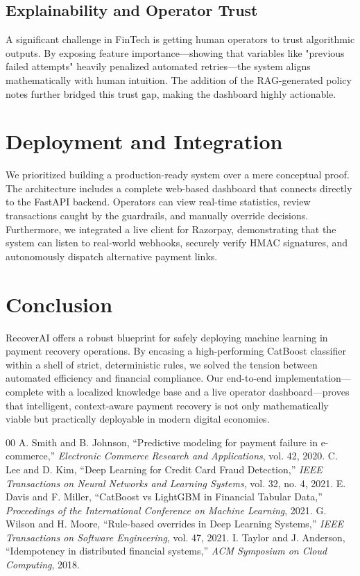 \documentclass[conference]{IEEEtran}
\begin{document}
\subsection{Explainability and Operator Trust}
A significant challenge in FinTech is getting human operators to trust algorithmic outputs. By exposing feature importance—showing that variables like "previous failed attempts" heavily penalized automated retries—the system aligns mathematically with human intuition. The addition of the RAG-generated policy notes further bridged this trust gap, making the dashboard highly actionable.

\section{Deployment and Integration}
We prioritized building a production-ready system over a mere conceptual proof. The architecture includes a complete web-based dashboard that connects directly to the FastAPI backend. Operators can view real-time statistics, review transactions caught by the guardrails, and manually override decisions. Furthermore, we integrated a live client for Razorpay, demonstrating that the system can listen to real-world webhooks, securely verify HMAC signatures, and autonomously dispatch alternative payment links.

\section{Conclusion}
RecoverAI offers a robust blueprint for safely deploying machine learning in payment recovery operations. By encasing a high-performing CatBoost classifier within a shell of strict, deterministic rules, we solved the tension between automated efficiency and financial compliance. Our end-to-end implementation—complete with a localized knowledge base and a live operator dashboard—proves that intelligent, context-aware payment recovery is not only mathematically viable but practically deployable in modern digital economies.

\begin{thebibliography}{00}
 A. Smith and B. Johnson, ``Predictive modeling for payment failure in e-commerce,'' \emph{Electronic Commerce Research and Applications}, vol. 42, 2020.
 C. Lee and D. Kim, ``Deep Learning for Credit Card Fraud Detection,'' \emph{IEEE Transactions on Neural Networks and Learning Systems}, vol. 32, no. 4, 2021.
 E. Davis and F. Miller, ``CatBoost vs LightGBM in Financial Tabular Data,'' \emph{Proceedings of the International Conference on Machine Learning}, 2021.
 G. Wilson and H. Moore, ``Rule-based overrides in Deep Learning Systems,'' \emph{IEEE Transactions on Software Engineering}, vol. 47, 2021.
 I. Taylor and J. Anderson, ``Idempotency in distributed financial systems,'' \emph{ACM Symposium on Cloud Computing}, 2018.
\end{thebibliography}
\end{document}
